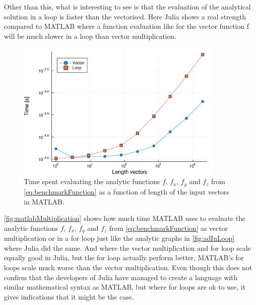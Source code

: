 Other than this, what is interesting to see is that the evaluation of the analytical solution in a loop is faster than the vectorised. Here Julia shows a real strength compared to MATLAB where a function evaluation like for the vector function f will be much slower in a loop than vector multiplication.
\begin{figure}[htb]
    \centering
    \includegraphics[width = 0.9\textwidth]{figures/benchmark_matlab_multiplication.pdf}
    \caption{Time spent evaluating the analytic functions $f$, $f_x$, $f_y$ and $f_z$ from \eqref{eq:benchmarkFunction} as a function of length of the input vectors in MATLAB.}
    \label{fig:matlabMultiplication}
\end{figure}
\autoref{fig:matlabMultiplication} shows how much time MATLAB uses to evaluate the analytic functions $f$, $f_x$, $f_y$ and $f_z$ from \eqref{eq:benchmarkFunction} as vector multiplication or in a for loop just like the analytic graphs in \autoref{fig:adInLoop} where Julia did the same. And where the vector multiplication and for loop scale equally good in Julia, but the for loop actually perform better, MATLAB's for loops scale much worse than the vector multiplication. Even though this does not confirm that the developers of Julia have managed to create a language with similar mathematical syntax as MATLAB, but where for loops are ok to use, it gives indications that it might be the case.

